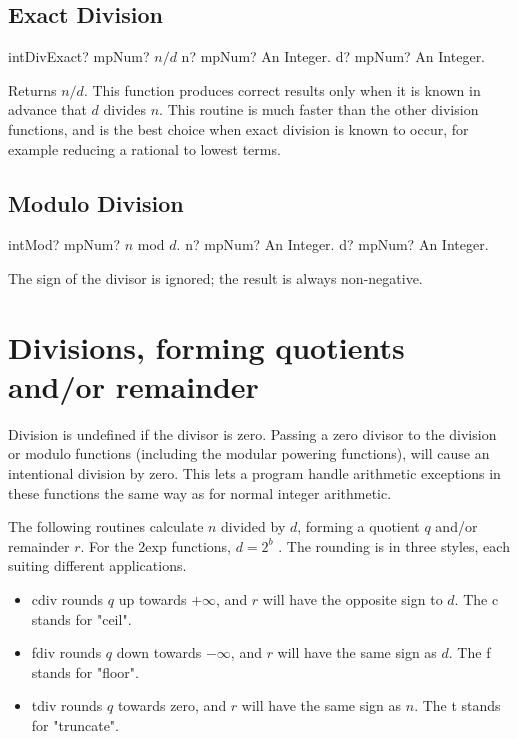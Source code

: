 \subsection{Exact Division}

\begin{mpFunctionsExtract}
	\mpFunctionTwo
	{intDivExact? mpNum? $n/d$}
	{n? mpNum? An Integer.}
	{d? mpNum? An Integer.}
\end{mpFunctionsExtract}

\vspace{0.3cm}
Returns $n/d$. This function produces correct results only when it is known in advance that $d$ divides $n$. This routine is much faster than the other division functions, and is the best choice when exact division is known to occur, for example reducing a rational to lowest terms.


\subsection{Modulo Division}

\begin{mpFunctionsExtract}
	\mpFunctionTwo
	{intMod? mpNum? $n$ mod $d$.}
	{n? mpNum? An Integer.}
	{d? mpNum? An Integer.}
\end{mpFunctionsExtract}

\vspace{0.3cm}
The sign of the divisor is ignored; the result is always non-negative.





\section{Divisions, forming quotients and/or remainder}
\label{DivisionsInt}

Division is undefined if the divisor is zero. Passing a zero divisor to the division or modulo
functions (including the modular powering functions), will cause an intentional division by zero. This lets a program handle arithmetic exceptions in these functions the same way as for normal integer arithmetic.

The following routines calculate $n$ divided by $d$, forming a quotient $q$ and/or remainder $r$. For the 2exp functions, $d = 2^b$ . The rounding is in three styles, each suiting different applications.


\begin{itemize}
	\item cdiv rounds $q$ up towards $+\infty$, and $r$ will have the opposite sign to $d$. The c stands for "ceil".
	\item fdiv rounds $q$ down towards $-\infty$, and $r$ will have the same sign as $d$. The f stands for "floor".
	\item tdiv rounds $q$ towards zero, and $r$ will have the same sign as $n$. The t stands for "truncate".
\end{itemize}

